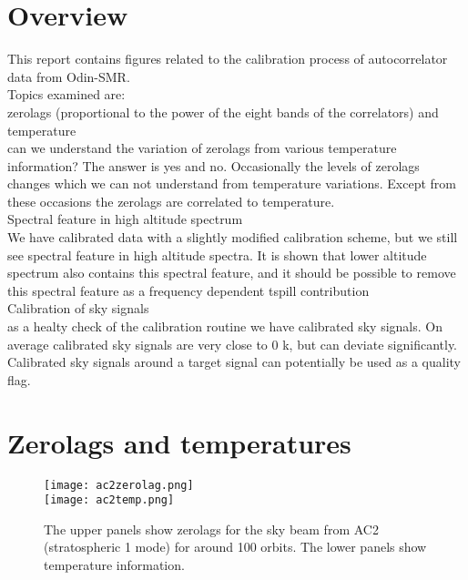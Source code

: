 \section{Overview}
This report contains figures related to the calibration
process of autocorrelator data from Odin-SMR.\\
\newline
Topics examined are:\\
\newline
zerolags (proportional to the power of the eight bands of the correlators) 
and temperature\\
can we understand the variation
of zerolags from various temperature information?
The answer is yes and no.
Occasionally the levels of zerolags changes which we can not
understand from temperature variations.
Except from these occasions the zerolags are correlated to temperature.\\
\newline
Spectral feature in high altitude spectrum\\
We have calibrated data with a slightly modified calibration scheme,
but we still see spectral feature in high altitude spectra.
It is shown that lower altitude spectrum also contains this
spectral feature, and it should be possible to remove this
spectral feature as a frequency dependent tspill contribution\\
\newline
Calibration of sky signals\\
as a healty check of the calibration routine we have calibrated
sky signals. On average calibrated sky signals are very close to 0 k,
but can deviate significantly. Calibrated sky signals around
a target signal can potentially be used as a quality flag.
 
    



\clearpage
\newpage

\section{Zerolags and temperatures}
\begin{figure}[!t]
\centering
\texttt{[image: ac2zerolag.png]}\\
\texttt{[image: ac2temp.png]}\\
\caption{The upper panels show zerolags for the sky beam from AC2 
(stratospheric 1 mode)
for around 100 orbits. The lower panels show temperature information.}
\label{fig:study1ac2a}
\end{figure}

